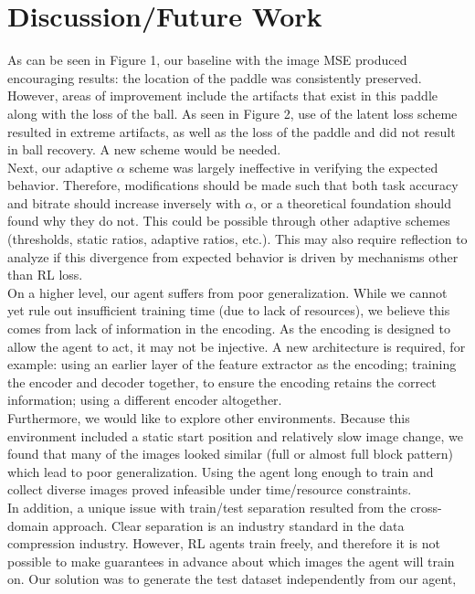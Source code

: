 \section{Discussion/Future Work}
As can be seen in Figure 1, our baseline with the image MSE produced encouraging
results: the location of the paddle was consistently preserved. However, areas
of improvement include the artifacts that exist in this paddle along with the
loss of the ball. As seen in Figure 2, use of the latent loss scheme resulted in
extreme artifacts, as well as the loss of the paddle and did not result in ball
recovery. A new scheme would be needed.\\
Next, our adaptive $\alpha$ scheme was largely ineffective in verifying the
expected behavior. Therefore, modifications should be made such that both task
accuracy and bitrate should increase inversely with $\alpha$, or a theoretical
foundation should found why they do not. This could be possible through other
adaptive schemes (thresholds, static ratios, adaptive ratios, etc.). This may
also require reflection to analyze if this divergence from expected behavior is
driven by mechanisms other than RL loss. \\
On a higher level, our agent suffers from poor generalization. While we cannot
yet rule out insufficient training time (due to lack of resources), we believe
this comes from lack of information in the encoding. As the encoding is designed
to allow the agent to act, it may not be injective. A new architecture is
required, for example: using an earlier layer of the feature extractor as the
encoding; training the encoder and decoder together, to ensure the encoding
retains the correct information; using a different encoder altogether.\\
Furthermore, we would like to explore other environments. Because this
environment included a static start position and relatively slow image change,
we found that many of the images looked similar (full or almost full block
pattern) which lead to poor generalization. Using the agent long enough to train
and collect diverse images proved infeasible under time/resource constraints.\\
In addition, a unique issue with train/test separation resulted from the
cross-domain approach. Clear separation is an industry standard in the data
compression industry. However, RL agents train freely, and therefore it is not
possible to make guarantees in advance about which images the agent will train
on. Our solution was to generate the test dataset independently from our agent,
